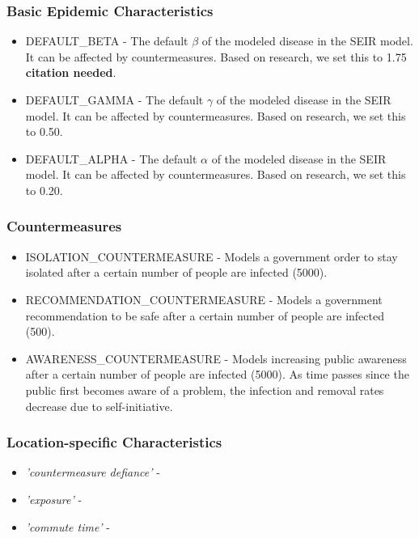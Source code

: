 \documentclass[12pt, a4, epsf] {article}
\theoremstyle{plain}
\theoremstyle{definition}
\begin{document}
\subsubsection{Basic Epidemic Characteristics}
\begin{itemize}
    \item DEFAULT\_BETA - The default $\beta$ of the modeled disease in the SEIR model. It can be affected by countermeasures. Based on research, we set this to 1.75 \textbf{citation needed}.
    \item DEFAULT\_GAMMA - The default $\gamma$ of the modeled disease in the SEIR model. It can be affected by countermeasures. Based on research, we set this to 0.50.
    \item DEFAULT\_ALPHA - The default $\alpha$ of the modeled disease in the SEIR model. It can be affected by countermeasures. Based on research, we set this to 0.20.
\end{itemize}
\subsubsection{Countermeasures}
\begin{itemize}
    \item ISOLATION\_COUNTERMEASURE - Models a government order to stay isolated after a certain number of people are infected (5000). 
    \item RECOMMENDATION\_COUNTERMEASURE - Models a government recommendation to be safe after a certain number of people are infected (500). 
    \item AWARENESS\_COUNTERMEASURE - Models increasing public awareness after a certain number of people are infected (5000). As time passes since the public first becomes aware of a problem, the infection and removal rates decrease due to self-initiative.
\end{itemize}
\subsubsection{Location-specific Characteristics}
\begin{itemize}
    \item \textit{'countermeasure defiance'} - 
    \item \textit{'exposure'} -
    \item \textit{'commute time'} -
\end{itemize}
\end{document}
